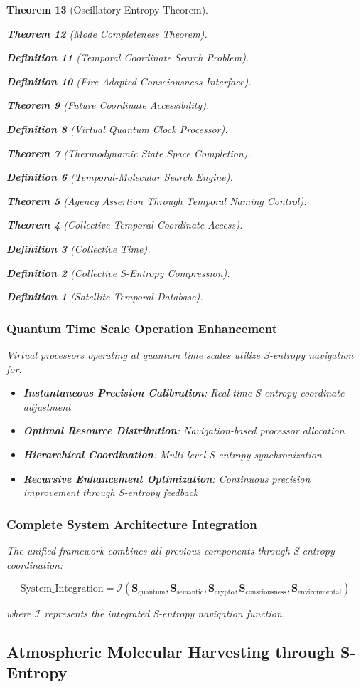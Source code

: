 \documentclass[12pt,a4paper]{article}
\newtheorem{theorem}{Theorem}[section]
\newtheorem{definition}[theorem]{Definition}
\begin{document}
\begin{theorem}[Oscillatory Entropy Theorem]
\begin{theorem}[Mode Completeness Theorem]
\begin{enumerate}
\begin{definition}[Temporal Coordinate Search Problem]
\begin{algorithm}
\begin{definition}[Fire-Adapted Consciousness Interface]
\begin{theorem}[Future Coordinate Accessibility]
\begin{definition}[Virtual Quantum Clock Processor]
\begin{itemize}
\begin{itemize}
\begin{theorem}[Thermodynamic State Space Completion]
\begin{definition}[Temporal-Molecular Search Engine]
\begin{theorem}[Agency Assertion Through Temporal Naming Control]
\begin{remark}
\begin{theorem}[Collective Temporal Coordinate Access]
\begin{definition}[Collective Time]
\begin{definition}[Collective S-Entropy Compression]
\begin{definition}[Satellite Temporal Database]
\begin{algorithm}
\begin{table}[h]
{{\subsubsection{Quantum Time Scale Operation Enhancement}

Virtual processors operating at quantum time scales utilize S-entropy navigation for:

\begin{itemize}
\item \textbf{Instantaneous Precision Calibration}: Real-time S-entropy coordinate adjustment
\item \textbf{Optimal Resource Distribution}: Navigation-based processor allocation
\item \textbf{Hierarchical Coordination}: Multi-level S-entropy synchronization
\item \textbf{Recursive Enhancement Optimization}: Continuous precision improvement through S-entropy feedback
\end{itemize}

\subsubsection{Complete System Architecture Integration}

The unified framework combines all previous components through S-entropy coordination:

\begin{equation}
\text{System\_Integration} = \mathcal{I}(\mathbf{S}_{\text{quantum}}, \mathbf{S}_{\text{semantic}}, \mathbf{S}_{\text{crypto}}, \mathbf{S}_{\text{consciousness}}, \mathbf{S}_{\text{environmental}})
\end{equation}

where $\mathcal{I}$ represents the integrated S-entropy navigation function.

\subsection{Atmospheric Molecular Harvesting through S-Entropy}

}}
\end{table}
\end{algorithm}
\end{definition}
\end{definition}
\end{definition}
\end{theorem}
\end{remark}
\end{theorem}
\end{definition}
\end{theorem}
\end{itemize}
\end{itemize}
\end{definition}
\end{theorem}
\end{definition}
\end{algorithm}
\end{definition}
\end{enumerate}
\end{theorem}
\end{theorem}
\end{document}
